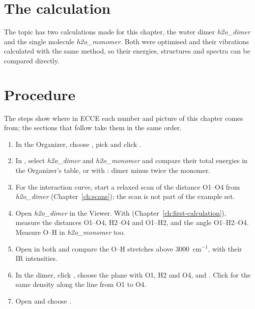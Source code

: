 \section{The calculation}
The topic  has two calculations made for this chapter, the water dimer \emph{h2o\_dimer} and the single molecule \emph{h2o\_monomer}. Both were optimised and their vibrations calculated with the same method, so their energies, structures and spectra can be compared directly.

\section{Procedure}
The steps show where in ECCE each number and picture of this chapter comes from; the sections that follow take them in the same order.
\begin{enumerate}
	\item In the Organizer, choose , pick  and click .
	\item In , select \emph{h2o\_dimer} and \emph{h2o\_monomer} and compare their total energies in the Organizer's table, or with : dimer minus twice the monomer.
	\item For the interaction curve, start a relaxed scan of the distance O1--O4 from \emph{h2o\_dimer} (Chapter~\ref{ch:scans}); the scan is not part of the example set.
	\item Open \emph{h2o\_dimer} in the Viewer. With  (Chapter~\ref{ch:first-calculation}), measure the distances O1--O4, H2--O4 and O1--H2, and the angle O1--H2--O4. Measure O--H in \emph{h2o\_monomer} too.
	\item Open  in both and compare the O--H stretches above 3000~cm$^{-1}$, with their IR intensities.
	\item In the dimer, click , choose the plane  with O1, H2 and O4, and . Click  for the same density along the line from O1 to O4.
	\item Open  and choose .
\end{enumerate}

